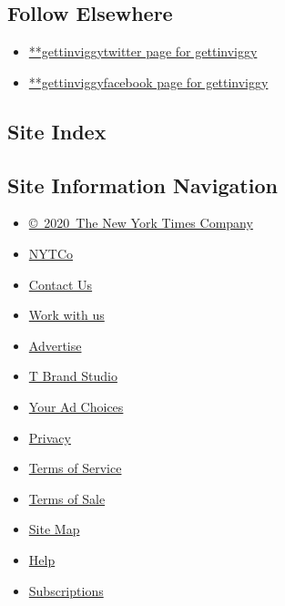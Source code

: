 \hypertarget{follow-elsewhere}{%
\subsection{Follow Elsewhere}\label{follow-elsewhere}}

\begin{itemize}
\tightlist
\item
  \href{https://twitter.com/gettinviggy}{**gettinviggytwitter page for
  gettinviggy}
\item
  \href{https://www.facebookcorewwwi.onion/gettinviggy}{**gettinviggyfacebook
  page for gettinviggy}
\end{itemize}

\hypertarget{site-index}{%
\subsection{Site Index}\label{site-index}}

\hypertarget{site-information-navigation}{%
\subsection{Site Information
Navigation}\label{site-information-navigation}}

\begin{itemize}
\tightlist
\item
  \href{https://help.nytimes3xbfgragh.onion/hc/en-us/articles/115014792127-Copyright-notice}{©~2020~The
  New York Times Company}
\end{itemize}

\begin{itemize}
\tightlist
\item
  \href{https://www.nytco.com/}{NYTCo}
\item
  \href{https://help.nytimes3xbfgragh.onion/hc/en-us/articles/115015385887-Contact-Us}{Contact
  Us}
\item
  \href{https://www.nytco.com/careers/}{Work with us}
\item
  \href{https://nytmediakit.com/}{Advertise}
\item
  \href{http://www.tbrandstudio.com/}{T Brand Studio}
\item
  \href{https://www.nytimes3xbfgragh.onion/privacy/cookie-policy\#how-do-i-manage-trackers}{Your
  Ad Choices}
\item
  \href{https://www.nytimes3xbfgragh.onion/privacy}{Privacy}
\item
  \href{https://help.nytimes3xbfgragh.onion/hc/en-us/articles/115014893428-Terms-of-service}{Terms
  of Service}
\item
  \href{https://help.nytimes3xbfgragh.onion/hc/en-us/articles/115014893968-Terms-of-sale}{Terms
  of Sale}
\item
  \href{https://spiderbites.nytimes3xbfgragh.onion}{Site Map}
\item
  \href{https://help.nytimes3xbfgragh.onion/hc/en-us}{Help}
\item
  \href{https://www.nytimes3xbfgragh.onion/subscription?campaignId=37WXW}{Subscriptions}
\end{itemize}

